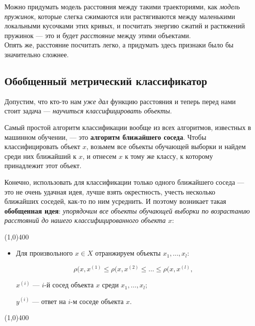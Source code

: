 \documentclass{article}
\begin{document}
Можно придумать модель расстояния между такими траекториями, как \textit{модель пружинок}, которые слегка сжимаются или растягиваются между маленькими локальными кусочками этих кривых, и посчитать энергию сжатий и растяжений пружинок --- это и будет \textit{расстояние} между этими объектами.
\\

Опять же, расстояние посчитать легко, а придумать здесь признаки было бы значительно сложнее. 

\newpage
\subsection{Обобщенный метрический классификатор}

Допустим, что кто-то нам \textit{уже дал} функцию расстояния и теперь перед нами стоит задача --- \textit{научиться классифицировать объекты}.

Самый простой алгоритм классификации вообще из всех алгоритмов, известных в машинном обучении, --- это \textbf{алгоритм ближайшего соседа}. Чтобы классифицировать объект $x$, возьмем все объекты обучающей выборки и найдем среди них ближайший к $x$, и отнесем $x$ к тому же классу, к которому принадлежит этот объект.

Конечно, использовать для классификации только одного ближайшего соседа --- это не очень удачная идея, лучше взять окрестность, учесть несколько ближайших соседей, как-то по ним усреднить. И поэтому возникает такая \textbf{обобщенная идея}: \textit{упорядочим все объекты обучающей выборки по возрастанию расстояний до нашего классифицированного объекта $x$}:

\begin{center}
\line(1,0){400}
\end{center}

\begin{itemize}
\item Для произвольного $x \in X$ отранжируем объекты $x_1, \ldots, x_l$:

$$\rho(x, x^{(1)} \leqslant \rho(x, x^{(2)} \leqslant \ldots \leqslant \rho(x, x^{(l)},$$

$x^{(i)}$ --- $i$-й сосед объекта $x$ среди $x_1, \ldots, x_l$;

$y^{(i)}$ --- ответ на $i$-м соседе объекта $x$.

\end{itemize}

\begin{center}
\line(1,0){400}
\end{center}
\end{document}
